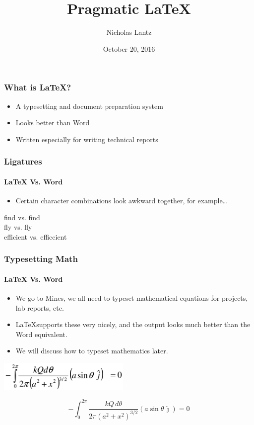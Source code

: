 \documentclass[xetex,mathserif,serif]{beamer}
\title{Pragmatic \LaTeX}
\author{Nicholas Lantz}
\institute{CSM Linux User's Group}
\date{October 20, 2016}
\begin{document}
\maketitle

\begin{frame}
    \frametitle{What is \LaTeX?}

    \begin{itemize}
        \item
            A typesetting and document preparation system
        \item
            Looks better than Word
        \item
            Written especially for writing technical reports
    \end{itemize}
\end{frame}

\begin{frame}
    \frametitle{Ligatures}
    \framesubtitle{\LaTeX{} Vs. Word}

    \begin{itemize}
        \item
            Certain character combinations look awkward together, for
            example\ldots
    \end{itemize}

    \Large
    find vs. {f}ind\\
    fly vs. {f}ly\\
    efficient vs. e{f}{f}{i}ccient
\end{frame}

\begin{frame}
    \frametitle{Typesetting Math}
    \framesubtitle{\LaTeX{} Vs. Word}

    \begin{itemize}
        \item
            We go to Mines, we all need to typeset mathematical equations for
            projects, lab reports, etc.
        \item
            \LaTeX supports these very nicely, and the output looks much better
            than the Word equivalent.
        \item
            We will discuss how to typeset mathematics later.
    \end{itemize}

    \centering
    \includegraphics[width=2.5in]{media/wordmath}

    \begin{displaymath}
        -\int_0^{2 \pi} \frac{kQ\, d\theta}{2\pi{\left(a^2 +
        x^2\right)}^{3/2}} (a \sin \theta \,\hat\jmath) = 0
    \end{displaymath}
\end{frame}
\end{document}
